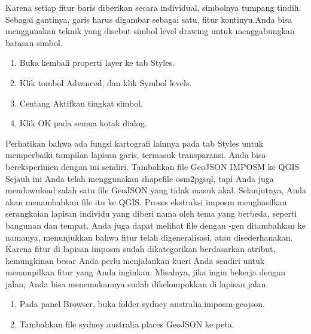 Karena setiap fitur baris diberikan secara individual, simbolnya tumpang tindih. Sebagai gantinya, garis harus digambar sebagai satu, fitur kontinyu.Anda bisa menggunakan teknik yang disebut simbol level drawing untuk menggabungkan batasan simbol.
\begin{enumerate}
\item
Buka kembali properti layer ke tab Styles.
\item
Klik tombol Advanced, dan klik Symbol levels.
\item
Centang Aktifkan tingkat simbol.
\item 
Klik OK pada semua kotak dialog.
\end{enumerate}

Perhatikan bahwa ada fungsi kartografi lainnya pada tab Styles untuk memperbaiki tampilan lapisan garis, termasuk transparansi. Anda bisa bereksperimen dengan ini sendiri.
Tambahkan file GeoJSON IMPOSM ke QGIS
Sejauh ini Anda telah menggunakan shapefile osm2pgsql, tapi Anda juga mendownload salah satu file GeoJSON yang tidak masuk akal. Selanjutnya, Anda akan menambahkan file itu ke QGIS.
Proses ekstraksi imposm menghasilkan serangkaian lapisan individu yang diberi nama oleh tema yang berbeda, seperti bangunan dan tempat. Anda juga dapat melihat file dengan -gen ditambahkan ke namanya, menunjukkan bahwa fitur telah digeneralisasi, atau disederhanakan. Karena fitur di lapisan imposm sudah dikategorikan berdasarkan atribut, kemungkinan besar Anda perlu menjalankan kueri Anda sendiri untuk menampilkan fitur yang Anda inginkan. Misalnya, jika ingin bekerja dengan jalan, Anda bisa menemukannya sudah dikelompokkan di lapisan jalan.
\begin{enumerate}
\item 
Pada panel Browser, buka folder sydney australia.imposm-geojson.
\item 
Tambahkan file sydney australia places GeoJSON ke peta.
\end{enumerate}


